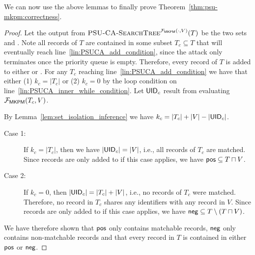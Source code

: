 We can now use the above lemmas to finally prove Theorem~\ref{thm:psu-mkpm:correctness}.


\begin{proof}
Let the output from $\textsc{PSU\mbox{-}CA\mbox{-}SearchTree}^{\mathcal{F}_{\mathsf{MKPM}}(\cdot, V)}(T)$ be the two sets \posSet{} and \negSet{}.
Note all records of $T$ are contained in some subset $T_c\subseteq T$ that will eventually reach line~\ref{lin:PSUCA_add_condition}, since the attack only terminates once the priority queue is empty. 
Therefore, every record of $T$ is added to either \posSet{} or \negSet{}. For any $T_c$ reaching line~\ref{lin:PSUCA_add_condition} we have that either (1) $k_c = |T_c|$ or (2) $k_c  = 0$ by the loop condition on line~\ref{lin:PSUCA_inner_while_condition}.
Let $\mathsf{UID}_c$ result from evaluating $\mathcal{F}_{\mathsf{MKPM}}(T_c, V)$.

By Lemma~\ref{lem:set_isolation_inference} we have $k_c = |T_c| + |V| - |\mathsf{UID}_c|$.
\begin{description}
  \item[Case 1:] If $k_c = |T_c|$, then we have $|\mathsf{UID}_c| = |V|$, i.e., all records of $T_c$ are matched. Since records are only added to \posSet{} if this case applies, we have $\mathsf{pos} \subseteq T \sqcap V$.
  \item[Case 2:] If $k_c = 0$, then $|\mathsf{UID}_c| = |T_c| + |V|$, i.e., no records of $T_c$ were matched. Therefore, no record in $T_c$ shares any identifiers with any record in $V$.
  Since records are only added to \negSet{} if this case applies, we have $\mathsf{neg} \subseteq T \setminus (T \sqcap V)$. 
\end{description}

We have therefore shown that $\mathsf{pos}$ only contains matchable records, $\mathsf{neg}$ only contains non-matchable records and that every record in $T$ is contained in either $\mathsf{pos}$ or $\mathsf{neg}$.
\end{proof}